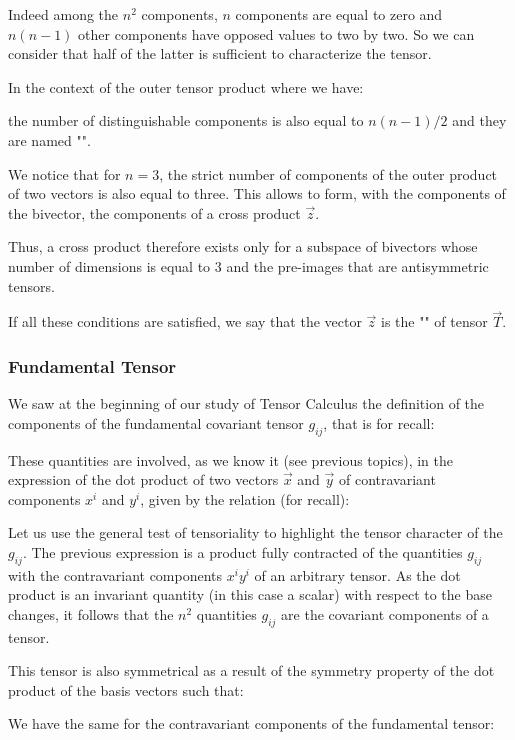 	Indeed among the $n^2$ components, $n$ components are equal to zero and $n(n-1)$ other components have opposed values to two by two. So we can consider that half of the latter is sufficient to characterize the tensor.

	In the context of the outer tensor product where we have:
	
	the number of distinguishable components is also equal to $n(n-1)/2$ and they are named "".
	
	We notice that for $n=3$, the strict number of components of the outer product of two vectors is also equal to three. This allows to form, with the components of the bivector, the components of a cross product $\vec{z}$.

	Thus, a cross product therefore exists only for a subspace of bivectors whose number of dimensions is equal to $3$ and the pre-images that are antisymmetric tensors.

	If all these conditions are satisfied, we say that the vector 
$\vec{z}$ is the "" of tensor $\vec{T}$.

	\subsubsection{Fundamental Tensor}
	We saw at the beginning of our study of Tensor Calculus the definition of the components of the fundamental covariant tensor $g_{ij}$, that is for recall:
	
	These quantities are involved, as we know it (see previous topics), in the expression of the dot product of two vectors $\vec{x}$ and $\vec{y}$ of contravariant components $x^i$ and $y^i$, given by the relation (for recall):
	
	Let us use the general test of tensoriality to highlight the tensor character of the $g_{ij}$. The previous expression is a product fully contracted of the quantities $g_{ij}$ with the contravariant components  $x^iy^i$ of an arbitrary tensor. As the dot product is an invariant quantity (in this case a scalar) with respect to the base changes, it follows that the $n^2$ quantities $g_{ij}$ are the covariant components of a tensor.

	This tensor is also symmetrical as a result of the symmetry property of the dot product of the basis vectors such that:
	
	We have the same for the contravariant components of the fundamental tensor:
	

